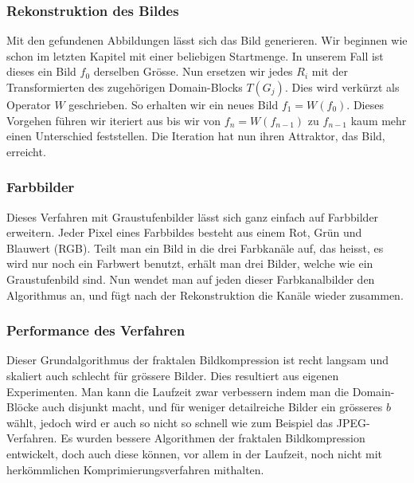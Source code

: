 \subsubsection{Rekonstruktion des Bildes}
Mit den gefundenen Abbildungen lässt sich das Bild generieren.
Wir beginnen wie schon im letzten Kapitel mit einer beliebigen Startmenge.
In unserem Fall ist dieses ein Bild  $f_0$ derselben Grösse.
Nun ersetzen wir jedes $R_i$ mit der Transformierten des zugehörigen Domain-Blocks $T(G_j)$.
Dies wird verkürzt als Operator $W$ geschrieben.
So erhalten wir ein neues Bild $f_1 = W(f_0)$.
Dieses Vorgehen führen wir iteriert aus bis wir von $f_n = W(f_{n-1})$ zu $f_{n-1}$ kaum mehr einen Unterschied feststellen. Die Iteration hat nun ihren Attraktor, das Bild, erreicht.

\subsubsection{Farbbilder}
Dieses Verfahren mit Graustufenbilder lässt sich ganz einfach auf Farbbilder erweitern.
Jeder Pixel eines Farbbildes besteht aus einem Rot, Grün und Blauwert (RGB).
Teilt man ein Bild in die drei Farbkanäle auf, das heisst, es wird nur noch ein Farbwert benutzt, erhält man drei Bilder, welche wie ein Graustufenbild sind.
Nun wendet man auf jeden dieser Farbkanalbilder den Algorithmus an, und fügt nach der Rekonstruktion die Kanäle wieder zusammen. 

\subsubsection{Performance des Verfahren}
Dieser Grundalgorithmus der fraktalen Bildkompression ist recht langsam und skaliert auch schlecht für grössere Bilder.
Dies resultiert aus eigenen Experimenten.
Man kann die Laufzeit zwar verbessern indem man die Domain-Blöcke auch disjunkt macht, und für weniger detailreiche Bilder ein grösseres $b$ wählt, jedoch wird er auch so nicht so schnell wie zum Beispiel das JPEG-Verfahren.
Es wurden bessere Algorithmen der fraktalen Bildkompression entwickelt, doch auch diese können, vor allem in der Laufzeit, noch nicht mit herkömmlichen Komprimierungsverfahren mithalten.

